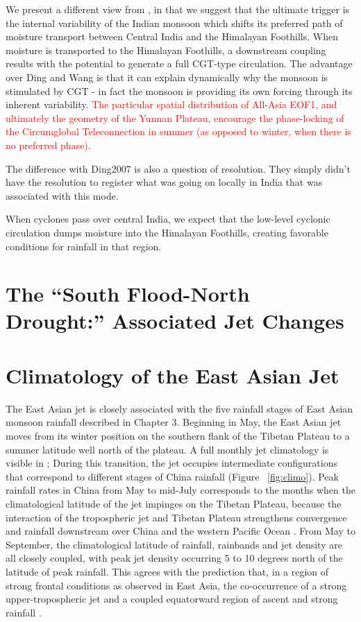 	We present a different view from \citet{Ding2007}, in that we suggest that the ultimate trigger is the internal variability of the Indian monsoon which shifts its preferred path of moisture transport between Central India and the Himalayan Foothills. When moisture is transported to the Himalayan Foothills, a downstream coupling results with the potential to generate a full CGT-type circulation. The advantage over Ding and Wang is that it can explain dynamically why the monsoon is stimulated by CGT - in fact the monsoon is providing its own forcing through its inherent variability. \textcolor{red}{The particular spatial distribution of All-Asia EOF1, and ultimately the geometry of the Yunnan Plateau, encourage the phase-locking of the Circumglobal Teleconnection in summer (as opposed to winter, when there is no preferred phase).}
	
	The difference with Ding2007 is also a question of resolution. They simply didn't have the resolution to register what was going on locally in India that was associated with this mode.
	
	When cyclones pass over central India, we expect that the low-level cyclonic circulation dumps moisture into the Himalayan Foothills, creating favorable conditions for rainfall in that region.
	


\section{The ``South Flood-North Drought:'' Associated Jet Changes}

\section{Climatology of the East Asian Jet}

	The East Asian jet is closely associated with the five rainfall stages of East Asian monsoon rainfall described in Chapter 3. Beginning in May, the East Asian jet moves from its winter position on the southern flank of the Tibetan Plateau to a summer latitude well north of the plateau.  A full monthly jet climatology is visible in \citet{Schiemann2009}; During this transition, the jet occupies intermediate configurations that correspond to different stages of China rainfall (Figure ~\ref{fig:climo}). Peak rainfall rates in China from May to mid-July corresponds to the months when the climatological latitude of the jet impinges on the Tibetan Plateau, because the interaction of the tropospheric jet and Tibetan Plateau strengthens convergence and rainfall downstream over China and the western Pacific Ocean \citep{Molnar2010,Sampe2010,Chen2014}. From May to September,  the climatological latitude of rainfall, rainbands and jet density are all closely coupled, with peak jet density occurring 5 to 10 degrees north of the latitude of peak rainfall. This agrees with the prediction that, in a region of strong frontal conditions as observed in East Asia, the co-occurrence of a strong upper-tropospheric jet and a coupled equatorward region of ascent and strong rainfall \citep{Holton2004}. 
	
